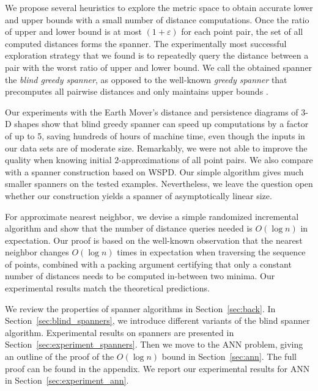 \documentclass[]{ws-ijcga}
\newcommand{\eps}{\varepsilon}
\begin{document}
We propose several heuristics to explore the metric space to obtain accurate lower and upper bounds
with a small number of distance computations. Once the ratio of upper and lower bound is at most $(1+\eps)$
for each point pair, the set of all computed distances forms the spanner.
The experimentally most successful exploration strategy that we found is to
repeatedly query the distance between a pair with the worst ratio of upper and lower bound.
We call the obtained spanner the \emph{blind greedy spanner}, as opposed to the well-known
\emph{greedy spanner} that precomputes all pairwise distances and only maintains upper bounds \cite{althofer1993sparse}.


Our experiments with the Earth Mover's distance and persistence
diagrams of 3-D shapes show that blind greedy spanner can speed up computations
by a factor of up to 5, saving hundreds of hours of machine time,
even though the inputs in our data sets are of moderate size.
Remarkably, we were not able to improve the quality when knowing initial $2$-approximations of all point pairs.
We also compare with a spanner construction based on WSPD. Our simple algorithm gives much smaller
spanners on the tested examples. 
Nevertheless, we leave the question open whether our construction
yields a spanner of asymptotically linear size. 

For approximate nearest neighbor, we devise a simple randomized incremental algorithm and show that
the number of distance queries needed is $O(\log n)$ in expectation.
Our proof is based on the well-known observation that the nearest neighbor changes $O(\log n)$ times
in expectation when traversing the sequence of points, combined with a packing argument certifying that
only a constant number of distances needs to be computed in-between two minima.
Our experimental results match the theoretical predictions.

We review the properties of spanner algorithms in Section~\ref{sec:back}.
In Section~\ref{sec:blind_spanners}, we introduce different
variants of the blind spanner algorithm. Experimental
results on spanners are presented in Section~\ref{sec:experiment_spanners}.
Then we move to the ANN problem, giving
an outline of the proof of the $O(\log n)$ bound in Section~\ref{sec:ann}.
The full proof can be found in the appendix.
We report our experimental results for ANN in Section~\ref{sec:experiment_ann}.
\end{document}

